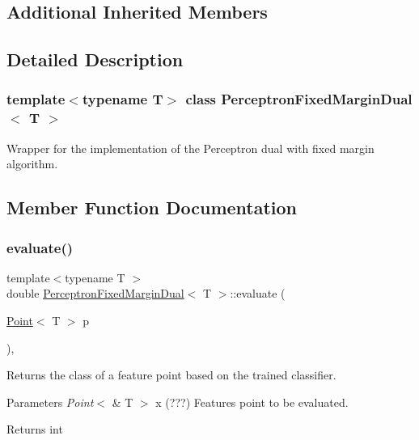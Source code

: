 \subsection*{Additional Inherited Members}


\subsection{Detailed Description}
\subsubsection*{template$<$typename T$>$\newline
class Perceptron\+Fixed\+Margin\+Dual$<$ T $>$}

Wrapper for the implementation of the Perceptron dual with fixed margin algorithm. 

\subsection{Member Function Documentation}
\mbox{\label{class_perceptron_fixed_margin_dual_acafabadf6d2552fde0bfb32f0344c6e3}} 
\subsubsection{\texorpdfstring{evaluate()}{evaluate()}}
{\footnotesize\ttfamily template$<$typename T $>$ \\
double \hyperlink{class_perceptron_fixed_margin_dual}{Perceptron\+Fixed\+Margin\+Dual}$<$ T $>$\+::evaluate (\begin{DoxyParamCaption}\item[{\hyperlink{class_point}{Point}$<$ T $>$}]{p }\end{DoxyParamCaption})\hspace{0.3cm}{\ttfamily [override]}, {\ttfamily [virtual]}}



Returns the class of a feature point based on the trained classifier. 


\begin{DoxyParams}{Parameters}
{\em Point$<$} & T $>$ x (???) Features point to be evaluated. \\
\hline
\end{DoxyParams}
\begin{DoxyReturn}{Returns}
int 
\end{DoxyReturn}



